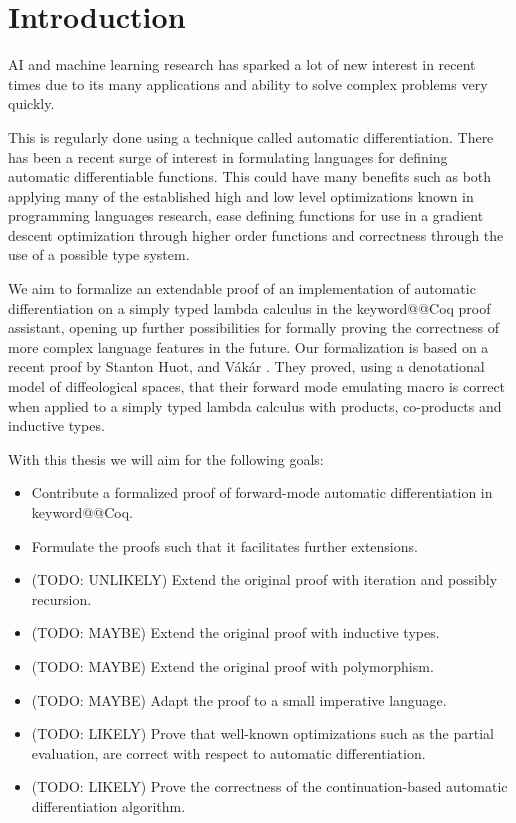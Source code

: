 \documentclass[12pt, final]{article}
\makeatletter
\def\Vakar{V\'{a}k\'{a}r}
\def\<#1>{\csname keyword@@#1\endcsname}
\makeatother
\begin{document}
\newpage

\setcounter{page}{2}
\tableofcontents
\newpage

\section{Introduction}

AI and machine learning research has sparked a lot of new interest in recent times due to its many applications and ability to solve complex problems very quickly.

This is regularly done using a technique called automatic differentiation.
There has been a recent surge of interest in formulating languages for defining automatic differentiable functions.
This could have many benefits such as both applying many of the established high and low level optimizations known in programming languages research, ease defining functions for use in a gradient descent optimization through higher order functions and correctness through the use of a possible type system.

We aim to formalize an extendable proof of an implementation of automatic differentiation on a simply typed lambda calculus in the \<Coq> proof assistant, opening up further possibilities for formally proving the correctness of more complex language features in the future.
Our formalization is based on a recent proof by Stanton Huot, and \Vakar{} \cite{huot2020correctness}.
They proved, using a denotational model of diffeological spaces, that their forward mode emulating macro is correct when applied to a simply typed lambda calculus with products, co-products and inductive types.


With this thesis we will aim for the following goals:
\begin{itemize}
  \item Contribute a formalized proof of forward-mode automatic differentiation in \<Coq>.
  \item Formulate the proofs such that it facilitates further extensions.
  \item (TODO: UNLIKELY) Extend the original proof with iteration and possibly recursion.
  \item (TODO: MAYBE) Extend the original proof with inductive types.
  \item (TODO: MAYBE) Extend the original proof with polymorphism.
  \item (TODO: MAYBE) Adapt the proof to a small imperative language.
  \item (TODO: LIKELY) Prove that well-known optimizations such as the partial evaluation, are correct with respect to automatic differentiation.
  \item (TODO: LIKELY) Prove the correctness of the continuation-based automatic differentiation algorithm.
\end{itemize}
\end{document}
